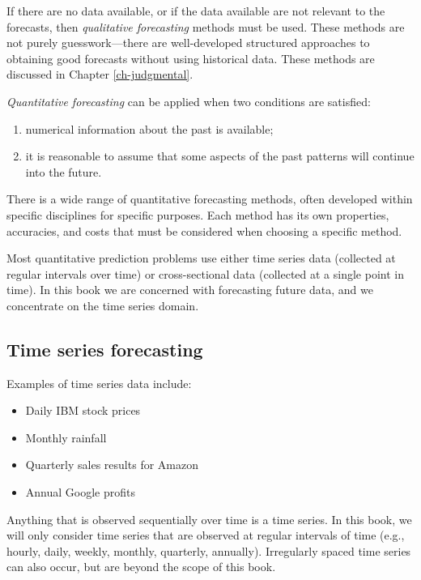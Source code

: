\documentclass[]{book}
\providecommand{\tightlist}{%
  \setlength{\itemsep}{0pt}\setlength{\parskip}{0pt}}
\begin{document}
If there are no data available, or if the data available are not relevant to the forecasts, then \emph{qualitative forecasting} methods must be used. These methods are not purely guesswork---there are well-developed structured approaches to obtaining good forecasts without using historical data. These methods are discussed in Chapter \ref{ch-judgmental}.

\emph{Quantitative forecasting} can be applied when two conditions are satisfied:

\begin{enumerate}
\def\labelenumi{\arabic{enumi}.}
\tightlist
\item
  numerical information about the past is available;
\item
  it is reasonable to assume that some aspects of the past patterns will continue into the future.
\end{enumerate}

There is a wide range of quantitative forecasting methods, often developed within specific disciplines for specific purposes. Each method has its own properties, accuracies, and costs that must be considered when choosing a specific method.

Most quantitative prediction problems use either time series data (collected at regular intervals over time) or cross-sectional data (collected at a single point in time). In this book we are concerned with forecasting future data, and we concentrate on the time series domain.

\hypertarget{time-series-forecasting}{%
\subsection*{Time series forecasting}\label{time-series-forecasting}}

Examples of time series data include:

\begin{itemize}
\tightlist
\item
  Daily IBM stock prices
\item
  Monthly rainfall
\item
  Quarterly sales results for Amazon
\item
  Annual Google profits
\end{itemize}

Anything that is observed sequentially over time is a time series. In this book, we will only consider time series that are observed at regular intervals of time (e.g., hourly, daily, weekly, monthly, quarterly, annually). Irregularly spaced time series can also occur, but are beyond the scope of this book.
\end{document}
